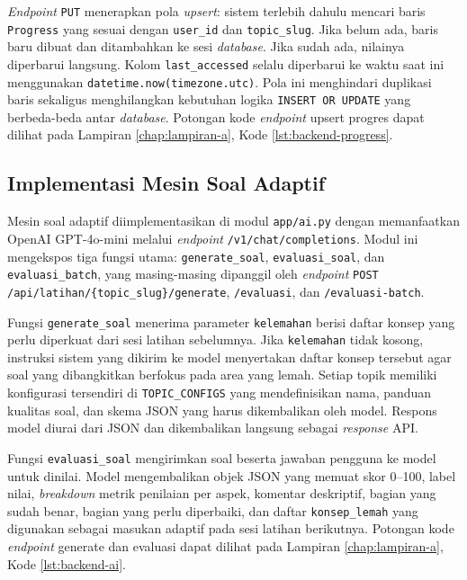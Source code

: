\textit{Endpoint} \texttt{PUT} menerapkan pola \textit{upsert}: sistem terlebih dahulu mencari baris \texttt{Progress} yang sesuai dengan \texttt{user\_id} dan \texttt{topic\_slug}. Jika belum ada, baris baru dibuat dan ditambahkan ke sesi \textit{database}. Jika sudah ada, nilainya diperbarui langsung. Kolom \texttt{last\_accessed} selalu diperbarui ke waktu saat ini menggunakan \texttt{datetime.now(\allowbreak{}timezone.utc)}. Pola ini menghindari duplikasi baris sekaligus menghilangkan kebutuhan logika \texttt{INSERT OR UPDATE} yang berbeda-beda antar \textit{database}. Potongan kode \textit{endpoint} upsert progres dapat dilihat pada Lampiran \ref{chap:lampiran-a}, Kode \ref{lst:backend-progress}.

\subsection{Implementasi Mesin Soal Adaptif}

Mesin soal adaptif diimplementasikan di modul \texttt{app/ai.py} dengan memanfaatkan OpenAI GPT-4o-mini melalui \textit{endpoint} \texttt{/v1/chat/completions}. Modul ini mengekspos tiga fungsi utama: \texttt{generate\_soal}, \texttt{evaluasi\_soal}, dan \texttt{evaluasi\_batch}, yang masing-masing dipanggil oleh \textit{endpoint} \texttt{POST /api/latihan/\allowbreak{}\{topic\_slug\}/generate}, \texttt{/evaluasi}, dan \texttt{/evaluasi-batch}.

Fungsi \texttt{generate\_soal} menerima parameter \texttt{kelemahan} berisi daftar konsep yang perlu diperkuat dari sesi latihan sebelumnya. Jika \texttt{kelemahan} tidak kosong, instruksi sistem yang dikirim ke model menyertakan daftar konsep tersebut agar soal yang dibangkitkan berfokus pada area yang lemah. Setiap topik memiliki konfigurasi tersendiri di \texttt{TOPIC\_CONFIGS} yang mendefinisikan nama, panduan kualitas soal, dan skema JSON yang harus dikembalikan oleh model. Respons model diurai dari JSON dan dikembalikan langsung sebagai \textit{response} API.

Fungsi \texttt{evaluasi\_soal} mengirimkan soal beserta jawaban pengguna ke model untuk dinilai. Model mengembalikan objek JSON yang memuat skor 0--100, label nilai, \textit{breakdown} metrik penilaian per aspek, komentar deskriptif, bagian yang sudah benar, bagian yang perlu diperbaiki, dan daftar \texttt{konsep\_lemah} yang digunakan sebagai masukan adaptif pada sesi latihan berikutnya. Potongan kode \textit{endpoint} generate dan evaluasi dapat dilihat pada Lampiran \ref{chap:lampiran-a}, Kode \ref{lst:backend-ai}.

